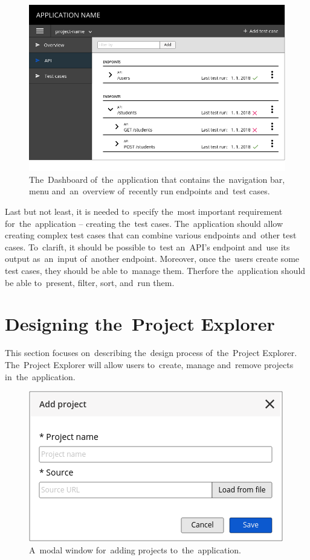 \begin{figure}[!hbt]
	\centering
	\includegraphics[scale=0.4]{./designs/drafts-1.0/dashboard.png}
	\caption{The~Dashboard of~the~application that contains the~navigation bar,
	menu and~an~overview of~recently run endpoints and~test cases.}
	\label{dashboard}
\end{figure}

Last but not least, it is needed to~specify the~most
important requirement for~the~application -- creating the~test cases.
The~application should allow creating complex test cases that can combine various 
endpoints and~other test cases. To~clarift, it should be possible
to~test an~API's endpoint and~use its output as~an~input of~another endpoint.
Moreover, once the~users create some test cases, they should be able to~manage
them. Therfore the~application should be able to~present, filter, sort, and~run
them.

\section{Designing the~Project Explorer}
This section focuses on~describing the~design process of~the~Project Explorer.
The~Project Explorer will allow users to~create, manage and~remove projects
in~the~application.

\begin{figure}[!hbt]
	\centering
	\includegraphics[scale=0.4]{./designs/drafts-1.0/add-project.png}
	\caption{A~modal window for~adding projects to~the~application.}
	\label{addProject}
\end{figure}

